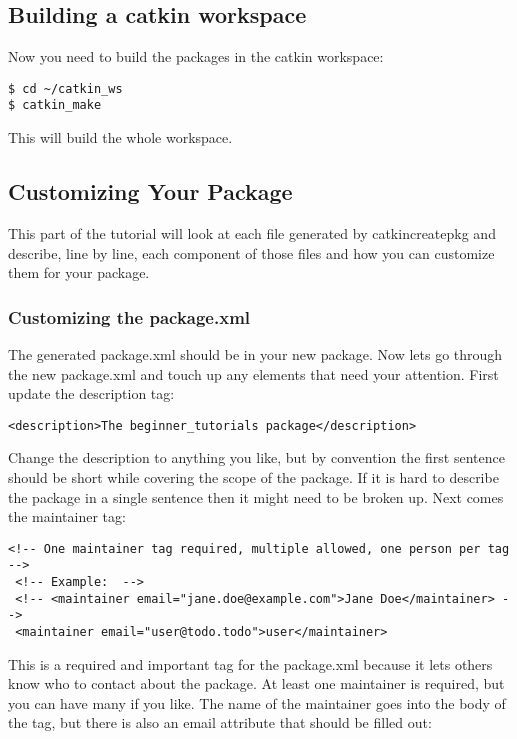 \subsection{Building a catkin workspace}
Now you need to build the packages in the catkin workspace:

\begin{lstlisting}[breaklines=true languages=bash]
$ cd ~/catkin_ws
$ catkin_make
\end{lstlisting}

\noindent This will build the whole workspace.

\subsection{Customizing Your Package}
This part of the tutorial will look at each file generated by catkin\textunderscore create\textunderscore pkg and describe, line by line, each component of those files and how you can customize them for your package.

\subsubsection{Customizing the package.xml}
The generated package.xml should be in your new package. Now lets go through the new package.xml and touch up any elements that need your attention.
\newline
\newline
First update the description tag:

\begin{lstlisting}[breaklines=false languages=xml]
<description>The beginner_tutorials package</description>
\end{lstlisting}
Change the description to anything you like, but by convention the first sentence should be short while covering the scope of the package. If it is hard to describe the package in a single sentence then it might need to be broken up.
\newline
\pagebreak
\newpage
Next comes the maintainer tag:
\begin{lstlisting}[breaklines=true languages=xml]
 <!-- One maintainer tag required, multiple allowed, one person per tag --> 
 <!-- Example:  -->
 <!-- <maintainer email="jane.doe@example.com">Jane Doe</maintainer> -->
 <maintainer email="user@todo.todo">user</maintainer>
\end{lstlisting}

\noindent This is a required and important tag for the package.xml because it lets others know who to contact about the package. At least one maintainer is required, but you can have many if you like. The name of the maintainer goes into the body of the tag, but there is also an email attribute that should be filled out:

